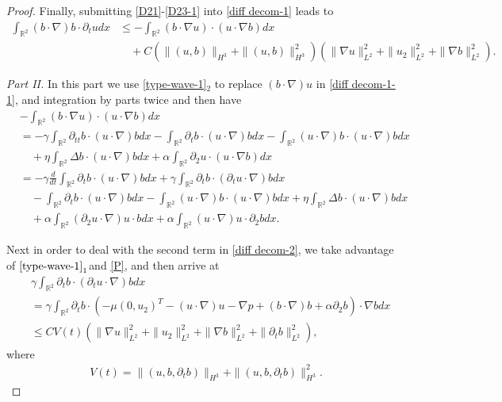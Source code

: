 \documentclass[reqno,11pt]{amsart}
\def\R{\mathbb R}
\numberwithin{Thm}{section}
\begin{document}
\begin{proof}
Finally, submitting \eqref{D21}-\eqref{D23-1} into \eqref{diff decom-1} leads to
\begin{align}\label{diff decom-1-1}
\int_{\R^2}(b\cdot \nabla)b\cdot \partial_tudx&\leq-\int_{\R^2}(b\cdot \nabla u)\cdot(u\cdot \nabla b)dx\nonumber\\
& \quad+C\left(\|(u,b)\|_{H^3}+\|(u,b)\|_{H^3}^2\right)\left(\|\nabla u\|_{L^{2}}^2+\|u_2\|_{L^2}^2+\|\nabla b\|_{L^2}^2\right).
\end{align}

 {\it {Part II.}} In this part we  use \eqref{type-wave-1}$_2$ to replace $(b\cdot \nabla) u$ in \eqref{diff decom-1-1}, and integration by parts twice and then have
\begin{align}
&-\int_{\R^2}(b\cdot \nabla u)\cdot(u\cdot \nabla b)dx\nonumber\\
&=-\gamma\int_{\R^2}\partial_{tt}b\cdot (u\cdot\nabla )bdx-\int_{\R^2}\partial_{t}b\cdot (u\cdot\nabla )bdx-\int_{\R^2}(u\cdot\nabla) b\cdot (u\cdot\nabla) bdx\nonumber\\
&\quad+\eta\int_{\R^2}\Delta b\cdot (u\cdot\nabla) bdx+\alpha\int_{\R^2}\partial_2u\cdot (u\cdot\nabla b)dx\nonumber\\
&=-\gamma\frac{d}{dt}\int_{\R^2}\partial_{t}b\cdot (u\cdot\nabla) bdx+\gamma\int_{\R^2}\partial_{t}b\cdot (\partial_{t}u\cdot\nabla) bdx\nonumber\\
&\quad-\int_{\R^2}\partial_{t}b\cdot (u\cdot\nabla) bdx-\int_{\R^2}(u\cdot\nabla) b\cdot (u\cdot\nabla) bdx+\eta\int_{\R^2}\Delta b\cdot (u\cdot\nabla) bdx\nonumber\\
&\quad+\alpha\int_{\R^2}(\partial_2u\cdot \nabla) u\cdot bdx+\alpha\int_{\R^2}(u\cdot \nabla )u\cdot\partial_2 bdx.
\label{diff decom-2}
\end{align}

Next in order to deal with the second term in \eqref{diff decom-2}, we take advantage of $\eqref{type-wave-1}_1$and \eqref{P}, and then arrive at
\begin{align}\label{DD}
&\gamma\int_{\R^2}\partial_{t}b\cdot (\partial_{t}u\cdot\nabla) bdx\nonumber\\
&=\gamma\int_{\R^2}\partial_{t}b\cdot (-\mu(0,u_2)^{T} - (u \cdot \nabla) u -\nabla p+(b \cdot \nabla) b+\alpha\partial_2 b)\cdot\nabla bdx\nonumber\\
&\leq  CV(t)\left(\|\nabla u\|_{L^{2}}^2+\|u_2\|_{L^2}^2+\|\nabla b\|_{L^2}^2+\|\partial_tb\|_{L^{2}}^2\right),
\end{align}
where
\begin{align}\label{VT}
V(t)=\|(u,b,\partial_tb)\|_{H^{3}}+\|(u,b,\partial_tb)\|_{H^{3}}^2.
\end{align}


\end{proof}
\end{document}
